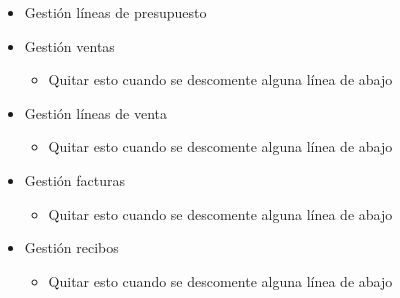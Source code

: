 \begin{itemize}
\begin{itemize}
			
		\end{itemize}
		\item Gestión líneas de presupuesto
		\begin{itemize}
		\end{itemize}
		\item Gestión ventas
		\begin{itemize}
			\item Quitar esto cuando se descomente alguna línea de abajo
		\end{itemize}
		\item Gestión líneas de venta
		\begin{itemize}
			\item Quitar esto cuando se descomente alguna línea de abajo
		\end{itemize}
		\item Gestión facturas
		\begin{itemize}
			\item Quitar esto cuando se descomente alguna línea de abajo
		\end{itemize}
		\item Gestión recibos
		\begin{itemize}
			\item Quitar esto cuando se descomente alguna línea de abajo

\end{itemize}
\end{itemize}
